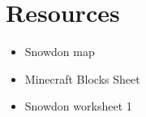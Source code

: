 \documentclass{geocraft-lesson-plan}
\begin{document}

\section*{Resources}
\begin{itemize}
\item Snowdon map
\item Minecraft Blocks Sheet
\item Snowdon worksheet 1
\end{itemize}

\end{document}
